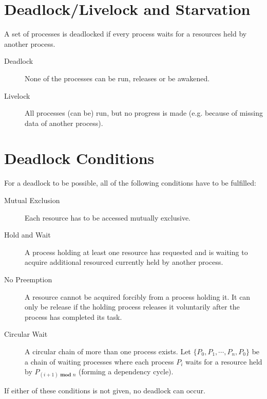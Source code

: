 \documentclass[a4paper, 11pt, accentcolor = tud3b]{tudreport}
\begin{document}
        \section{Deadlock/Livelock and Starvation}
            A set of processes is deadlocked if every process waits for a resources held by another process.
            \begin{description}
            	\item[Deadlock] None of the processes can be run, releases or be awakened.
            	\item[Livelock] All processes (can be) run, but no progress is made (e.g. because of missing data of another process).
            \end{description}

        \section{Deadlock Conditions}
            For a deadlock to be possible, all of the following conditions have to be fulfilled:
            \begin{description}
            	\item[Mutual Exclusion] Each resource has to be accessed mutually exclusive.
            	\item[Hold and Wait] A process holding at least one resource has requested and is waiting to acquire additional resourced currently held by another process.
            	\item[No Preemption] A resource cannot be acquired forcibly from a process holding it. It can only be release if the holding process releases it voluntarily after the process has completed its task.
            	\item[Circular Wait] A circular chain of more than one process exists. Let \( \{ P_0, P_1, \cdots, P_n, P_0 \} \) be a chain of waiting processes where each process \( P_i \) waits for a resource held by \( P_{ (i + 1) \textbf{ mod } n } \) (forming a dependency cycle).
            \end{description}
	        If either of these conditions is not given, no deadlock can occur.
\end{document}
